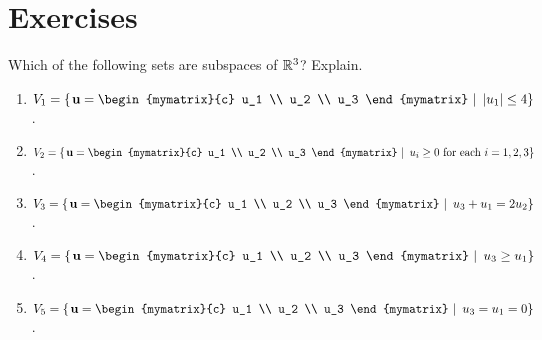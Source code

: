 \section*{Exercises}

\begin{ex}
  Which of the following sets are subspaces of $\mathbb{R}^3$? Explain.
  \begin{enumerate}
  \item $V_1=\set{\left.\vect{u}=\begin{mymatrix}{c}
          u_1 \\ u_2 \\ u_3
        \end{mymatrix}~\right\vert~ \abs{u_1} \leq 4}$.
  \item $V_2=\set{\left.\vect{u}=\begin{mymatrix}{c}
          u_1 \\ u_2 \\ u_3
        \end{mymatrix}~\right\vert~ u_i\geq 0\text{ for each }i=1,2,3}$.
  \item $V_3=\set{\left.\vect{u}=\begin{mymatrix}{c}
          u_1 \\ u_2 \\ u_3
        \end{mymatrix}~\right\vert~ u_3+u_1=2u_2}$.
  \item $V_4=\set{\left.\vect{u}=\begin{mymatrix}{c}
          u_1 \\ u_2 \\ u_3
        \end{mymatrix}~\right\vert~ u_3\geq u_1}$.
  \item $V_5=\set{\left.\vect{u}=\begin{mymatrix}{c}
          u_1 \\ u_2 \\ u_3
        \end{mymatrix}~\right\vert~ u_3=u_1=0}$.
  \end{enumerate}


\end{ex}

